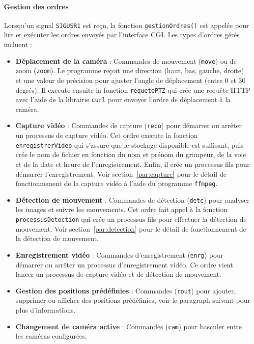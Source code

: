 \documentclass[a4paper, 11pt, french]{article}
\begin{document}
\paragraph{Gestion des ordres}
Lorsqu'un signal \texttt{SIGUSR1} est reçu, la fonction \texttt{gestionOrdres()} est appelée pour lire et exécuter les ordres envoyés par l'interface CGI. Les types d'ordres gérés incluent :
\begin{itemize}
    \item \textbf{Déplacement de la caméra} : Commandes de mouvement (\texttt{move}) ou de zoom (\texttt{zoom}). Le programme reçoit une direction (haut, bas, gauche, droite) et une valeur de précision pour ajuster l'angle de déplacement (entre 0 et 30 degrés). Il execute ensuite la fonction \texttt{requetePTZ} qui crée une requête HTTP avec l'aide de la librairie \texttt{curl} pour envoyer l'ordre de déplacement à la caméra.
    \item \textbf{Capture vidéo} : Commandes de capture (\texttt{reco}) pour démarrer ou arrêter un processus de capture vidéo. Cet ordre execute la fonction \texttt{enregistrerVideo} qui s'assure que le stockage disponible est suffisant, puis crée le nom de fichier en fonction du nom et prénom du grimpeur, de la voie et de la date et heure de l'enregistrement. Enfin, il crée un processus fils pour démarrer l'enregistrement. Voir section~\ref{par:capture} pour le détail de fonctionnement de la capture vidéo à l'aide du programme \texttt{ffmpeg}.
    \item \textbf{Détection de mouvement} : Commandes de détection (\texttt{detc}) pour analyser les images et suivre les mouvements. Cet ordre fait appel à la fonction \texttt{processusDetection} qui crée un processus fils pour effectuer la détection de mouvement. Voir section~\ref{par:detection} pour le détail de fonctionnement de la détection de mouvement.
    \item \textbf{Enregistrement vidéo} : Commandes d'enregistrement (\texttt{enrg}) pour démarrer ou arrêter un processus d'enregistrement vidéo. Ce ordre vient lancer un processus de capture vidéo et de détection de mouvement.
    \item \textbf{Gestion des positions prédéfinies} : Commandes (\texttt{rout}) pour ajouter, supprimer ou afficher des positions prédéfinies, voir le paragraph suivant pour plus d'informations.
    \item \textbf{Changement de caméra active} : Commandes (\texttt{cam}) pour basculer entre les caméras configurées.
\end{itemize}
\end{document}
